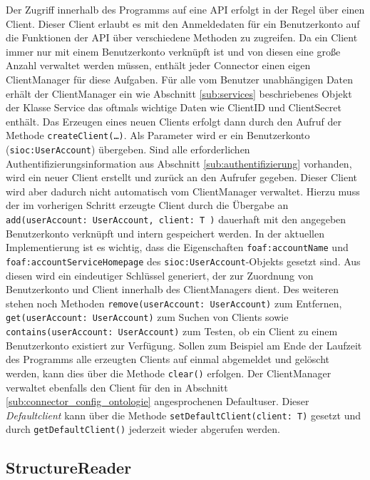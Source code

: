 Der Zugriff innerhalb des Programms auf eine API erfolgt in der Regel über einen Client. Dieser Client erlaubt es mit den Anmeldedaten für ein Benutzerkonto auf die Funktionen der API über verschiedene Methoden zu zugreifen. Da ein Client immer nur mit einem Benutzerkonto verknüpft ist und von diesen eine große Anzahl verwaltet werden müssen, enthält jeder Connector einen eigen ClientManager für diese Aufgaben. Für alle vom Benutzer unabhängigen Daten erhält der ClientManager ein wie Abschnitt \ref{sub:services} beschriebenes Objekt der Klasse Service das oftmals wichtige Daten wie ClientID und ClientSecret enthält. Das Erzeugen eines neuen Clients erfolgt dann durch den Aufruf der Methode \texttt{createClient(\dots)}. Als Parameter wird er ein Benutzerkonto (\texttt{sioc:UserAccount}) übergeben. Sind alle erforderlichen Authentifizierungsinformation aus Abschnitt \ref{sub:authentifizierung} vorhanden, wird ein neuer Client erstellt und zurück an den Aufrufer gegeben. Dieser Client wird aber dadurch nicht automatisch vom ClientManager verwaltet. Hierzu muss der im vorherigen Schritt erzeugte Client durch die Übergabe an \texttt{add(userAccount: UserAccount, client: T )} dauerhaft mit den angegeben Benutzerkonto verknüpft und intern gespeichert werden. In der aktuellen Implementierung ist es wichtig, dass die Eigenschaften \texttt{foaf:accountName} und \texttt{foaf:accountServiceHomepage} des \texttt{sioc:UserAccount}-Objekts gesetzt sind. Aus diesen wird ein eindeutiger Schlüssel generiert, der zur Zuordnung von Benutzerkonto und Client innerhalb des ClientManagers dient. Des weiteren stehen noch Methoden \texttt{remove(userAccount: UserAccount)} zum Entfernen, \texttt{get(userAccount: UserAccount)} zum Suchen von Clients sowie \texttt{contains(userAccount: UserAccount)} zum Testen, ob ein Client zu einem Benutzerkonto existiert zur Verfügung. Sollen zum Beispiel am Ende der Laufzeit des Programms alle erzeugten Clients auf einmal abgemeldet und gelöscht werden, kann dies über die Methode \texttt{clear()} erfolgen. Der ClientManager verwaltet ebenfalls den Client für den in Abschnitt \ref{sub:connector_config_ontologie} angesprochenen Defaultuser. Dieser \emph{Defaultclient} kann über die Methode  \texttt{setDefaultClient(client: T)} gesetzt und durch \texttt{getDefaultClient()} jederzeit wieder abgerufen werden. 


\subsection{StructureReader} %
\label{sub:structurereader}

